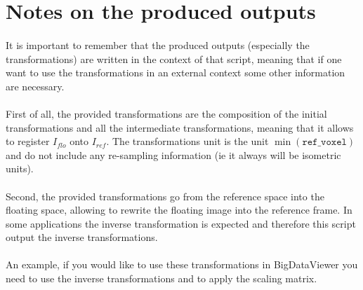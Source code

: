 \documentclass[10pt,a4paper]{book}
\begin{document}
\section{Notes on the produced outputs}
\paragraph{}It is important to remember that the produced outputs (especially the transformations) are written in the context of that script, meaning that if one want to use the transformations in an external context some other information are necessary.
\paragraph{}First of all, the provided transformations are the composition of the initial transformations and all the intermediate transformations, meaning that it allows to register $I_{flo}$ onto $I_{ref}$. The transformations unit is the unit $\min(\texttt{ref\_voxel})$ and do not include any re-sampling information (ie it always will be isometric units).
\paragraph{}Second, the provided transformations go from the reference space into the floating space, allowing to rewrite the floating image into the reference frame. In some applications the inverse transformation is expected and therefore this script output the inverse transformations.
\paragraph{}An example, if you would like to use these transformations in BigDataViewer you need to use the inverse transformations and to apply the scaling matrix.


\end{document}
